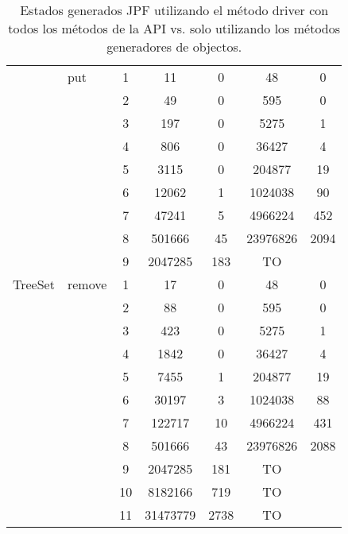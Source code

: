 \begin{table}
\begin{tabular}{ c| l| c c c c c}
\hline
\multirow{19}{*}{TreeSet} 
&put
  & 1 & 11  & 0 & 48  & 0 \\
& & 2 & 49  & 0 & 595 & 0 \\
& & 3 & 197 & 0 & 5275  & 1 \\
& & 4 & 806 & 0 & 36427 & 4 \\
& & 5 & 3115  & 0 & 204877  & 19  \\
& & 6 & 12062 & 1 & 1024038 & 90  \\
& & 7 & 47241 & 5 & 4966224 & 452 \\
& & 8 & 501666  & 45  & 23976826  & 2094  \\
& & 9 & 2047285 & 183 &TO  &  \\
\cline{2-7}

& remove
  & 1 & 17  & 0 & 48  & 0 \\
& & 2 & 88  & 0 & 595 & 0 \\
& & 3 & 423 & 0 & 5275  & 1 \\
& & 4 & 1842  & 0 & 36427 & 4 \\
& & 5 & 7455  & 1 & 204877  & 19  \\
& & 6 & 30197 & 3 & 1024038 & 88  \\
& & 7 & 122717  & 10  & 4966224 & 431 \\
& & 8 & 501666  & 43  & 23976826  & 2088  \\
& & 9 & 2047285 & 181 & TO    \\
& & 10  & 8182166 & 719 &    TO  \\
& & 11  & 31473779  & 2738  &  TO     \\
\hline

\end{tabular}%
\caption{Estados generados JPF utilizando el método driver con todos los métodos de la API vs. solo utilizando los métodos generadores de objectos.}
\label{tab:results-jpf1}
 \end{table}

